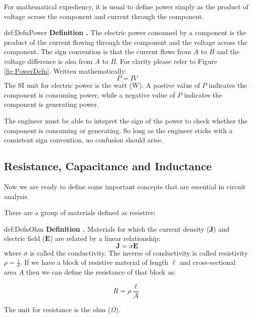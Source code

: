 \documentclass[14pt,a5paper,twoside]{book}
\newenvironment{myDefinition}[2]{ \begin{Definition}[adjusted title=#1]{}{#2} 
  \textbf{Definition \thetcbcounter.} \label{#2}}{\end{Definition}}
\begin{document}
For mathematical expediency, it is usual to define power simply as the product of voltage across the component and current through the component.

\begin{myDefinition}{Electric Power}{def:DefnPower}
	The electric power consumed by a component is the product of the current flowing through the component and the voltage across the component. The sign convention is that the current flows from $A$ to $B$ and the voltage difference is also from $A$ to $B$. For clarity please refer to Figure \ref{fig:PowerDefn}. Written mathematically:
	$$P = IV$$
	The SI unit for electric power is the watt (W). A postive value of $P$ indicates the component is consuming power, while a negative value of $P$ indicates the component is generating power.
\end{myDefinition}

The engineer must be able to intepret the sign of the power to check whether the component is consuming or generating. So long as the engineer sticks with a consistent sign convention, no confusion should arise. 


\newpage
\subsection{Resistance, Capacitance and Inductance}
Now we are ready to define some important concepts that are essential in circuit analysis.

There are a group of materials defined as resistive:

\begin{myDefinition}{Resistance}{def:DefnOhm}
	Materials for which the current density ($\mathbf{J}$) and electric field ($\mathbf{E}$) are related by a linear relationship:
	$$\mathbf{J} = \sigma \mathbf{E}$$
	where $\sigma$ is called the conductivity. The inverse of conductivity is called resistivity $\rho = \frac{1}{\sigma}$. If we have a block of resistive material of length $\ell$ and cross-sectional area $A$ then we can define the resistance of that block as:
	
	$$
	R = \rho\frac{\ell}{ A}
	$$
	
	The unit for resistance is the ohm ($\Omega$).
\end{myDefinition}
\end{document}
